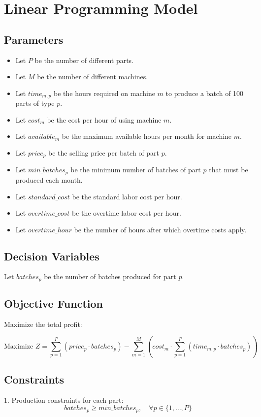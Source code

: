 \documentclass{article}
\begin{document}
\section*{Linear Programming Model}

\subsection*{Parameters}
\begin{itemize}
    \item Let \( P \) be the number of different parts.
    \item Let \( M \) be the number of different machines.
    \item Let \( time_{m,p} \) be the hours required on machine \( m \) to produce a batch of 100 parts of type \( p \).
    \item Let \( cost_{m} \) be the cost per hour of using machine \( m \).
    \item Let \( available_{m} \) be the maximum available hours per month for machine \( m \).
    \item Let \( price_{p} \) be the selling price per batch of part \( p \).
    \item Let \( min\_batches_{p} \) be the minimum number of batches of part \( p \) that must be produced each month.
    \item Let \( standard\_cost \) be the standard labor cost per hour.
    \item Let \( overtime\_cost \) be the overtime labor cost per hour.
    \item Let \( overtime\_hour \) be the number of hours after which overtime costs apply.
\end{itemize}

\subsection*{Decision Variables}
Let \( batches_{p} \) be the number of batches produced for part \( p \).

\subsection*{Objective Function}
Maximize the total profit:

\[
\text{Maximize } Z = \sum_{p=1}^{P} (price_{p} \cdot batches_{p}) - \sum_{m=1}^{M} (cost_{m} \cdot \sum_{p=1}^{P} (time_{m,p} \cdot batches_{p}))
\]

\subsection*{Constraints}
1. Production constraints for each part:
\[
batches_{p} \geq min\_batches_{p}, \quad \forall p \in \{1, \ldots, P\}
\]
\end{document}
